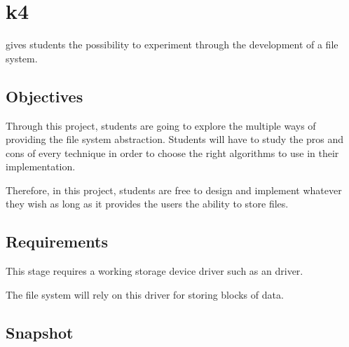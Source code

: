 %
%
%
%
%
%

%
%

\chapter{k4}
\label{chapter:k4}

 gives students the possibility to experiment through the development
of a file system.

\newpage

%
%

%
%

\section{Objectives}

Through this project, students are going to explore the multiple ways of
providing the file system abstraction. Students will have to study the pros
and cons of every technique in order to choose the right algorithms to use in
their implementation.

Therefore, in this project, students are free to design and implement whatever
they wish as long as it provides the users the ability to store files.

%
%

\section{Requirements}

This stage requires a working storage device driver such as an  driver.

The file system will rely on this driver for storing blocks of data.

%
%

\section{Snapshot}

